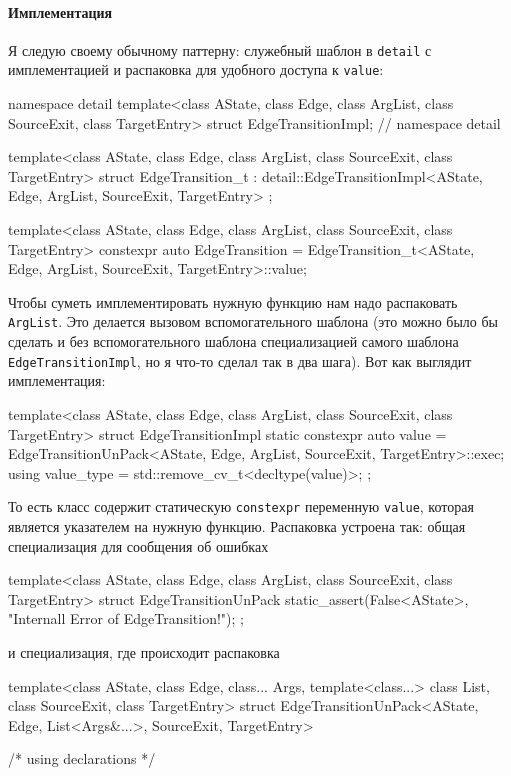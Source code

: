 \documentclass{article}
\begin{document}
{\paragraph{Имплементация}

Я следую своему обычному паттерну: служебный шаблон в \verb"detail" с имплементацией и распаковка для удобного доступа к \verb"value":
\begin{cppcode}[\nonumbers]
namespace detail {
template<class AState, class Edge, class ArgList, class SourceExit, class TargetEntry>
struct EdgeTransitionImpl;
} // namespace detail

template<class AState, class Edge, class ArgList, class SourceExit, class TargetEntry>
struct EdgeTransition_t : detail::EdgeTransitionImpl<AState, Edge, ArgList,
                                                     SourceExit, TargetEntry> {
};

template<class AState, class Edge, class ArgList, class SourceExit, class TargetEntry>
constexpr auto EdgeTransition =
    EdgeTransition_t<AState, Edge, ArgList, SourceExit, TargetEntry>::value;
\end{cppcode}
Чтобы суметь имплементировать нужную функцию нам надо распаковать \verb"ArgList".
Это делается вызовом вспомогательного шаблона (это можно было бы сделать и без вспомогательного шаблона специализацией самого шаблона \verb"EdgeTransitionImpl", но я что-то сделал так в два шага).
Вот как выглядит имплементация:
\begin{cppcode}[\nonumbers]
template<class AState, class Edge, class ArgList, class SourceExit, class TargetEntry>
struct EdgeTransitionImpl {
  static constexpr auto value =
      EdgeTransitionUnPack<AState, Edge, ArgList, SourceExit, TargetEntry>::exec;
  using value_type = std::remove_cv_t<decltype(value)>;
};
\end{cppcode}
То есть класс содержит статическую \verb"constexpr" переменную \verb"value", которая является указателем на нужную функцию.
Распаковка устроена так: общая специализация для сообщения об ошибках
\begin{cppcode}
template<class AState, class Edge, class ArgList, class SourceExit, class TargetEntry>
struct EdgeTransitionUnPack {
  static_assert(False<AState>, "Internall Error of EdgeTransition!");
};
\end{cppcode}
и специализация, где происходит распаковка
\begin{cppcode}[\nonumbers]
template<class AState, class Edge, class... Args, template<class...> class List,
         class SourceExit, class TargetEntry>
struct EdgeTransitionUnPack<AState, Edge, List<Args&...>, SourceExit, TargetEntry> {
  /* using declarations */
  
}
\end{cppcode}}
\end{document}
